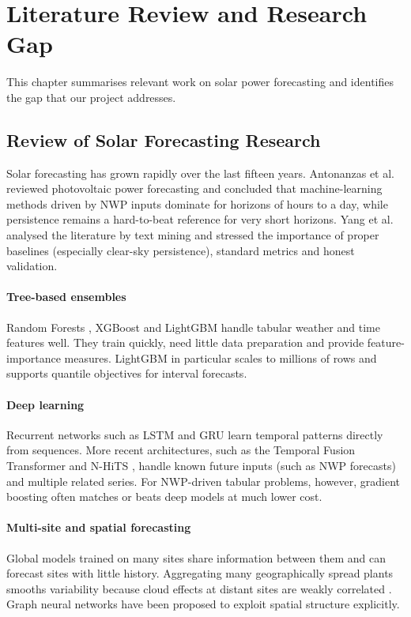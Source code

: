 \documentclass[12pt]{report}
\begin{document}
\chapter{Literature Review and Research Gap}
This chapter summarises relevant work on solar power forecasting and identifies the gap that our project addresses.

\section{Review of Solar Forecasting Research}
\vspace{1mm}
Solar forecasting has grown rapidly over the last fifteen years. Antonanzas et al.\ \cite{antonanzas2016} reviewed photovoltaic power forecasting and concluded that machine-learning methods driven by NWP inputs dominate for horizons of hours to a day, while persistence remains a hard-to-beat reference for very short horizons. Yang et al.\ \cite{yang2018} analysed the literature by text mining and stressed the importance of proper baselines (especially clear-sky persistence), standard metrics and honest validation.

\subsubsection{Tree-based ensembles}
Random Forests \cite{breiman2001}, XGBoost \cite{xgboost} and LightGBM \cite{lightgbm} handle tabular weather and time features well. They train quickly, need little data preparation and provide feature-importance measures. LightGBM in particular scales to millions of rows and supports quantile objectives for interval forecasts.

\subsubsection{Deep learning}
Recurrent networks such as LSTM \cite{lstm} and GRU \cite{gru} learn temporal patterns directly from sequences. More recent architectures, such as the Temporal Fusion Transformer \cite{tft} and N-HiTS \cite{nhits}, handle known future inputs (such as NWP forecasts) and multiple related series. For NWP-driven tabular problems, however, gradient boosting often matches or beats deep models at much lower cost.

\subsubsection{Multi-site and spatial forecasting}
Global models trained on many sites share information between them and can forecast sites with little history. Aggregating many geographically spread plants smooths variability because cloud effects at distant sites are weakly correlated \cite{hoff2010}. Graph neural networks have been proposed to exploit spatial structure explicitly.
\end{document}
